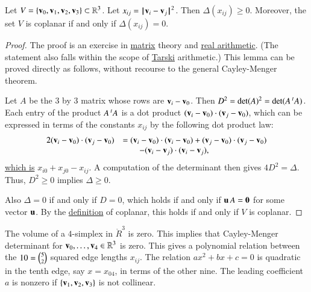 \begin{lemma}[]\label{lemma:delta-pos}
  Let $V=\{{\mathbf v}_0,{\mathbf v}_1,{\mathbf v}_2,{\mathbf v}_3\}\subset\mathbb{R}^3$.  Let $x_{ij} =
  \norm{\v_i}{\v_j}^2$.  Then $\Delta(x_{ij})\ge 0$.  Moreover, the
  set $V$ is coplanar if and only if $\Delta(x_{ij}) = 0$.
\end{lemma}

\begin{proof} The proof is an exercise in
  \hyperref[back:matrix]{matrix} theory and
  \hyperref[back:analysis]{real arithmetic}.  (The statement also
  falls within the scope of \hyperref[back:tarski]{Tarski}
  arithmetic.)  This lemma can be proved directly as follows, without
  recourse to the general Cayley-Menger theorem.

  Let $A$ be the $3$ by $3$ matrix whose rows are ${\mathbf v}_i - {\mathbf v}_0$.  Then
  $D^2 = \det(A)^2 = \det(A \,\hbox{}^t A)$.  Each entry of the
  product $A\,\hbox{}^tA$ is a dot product $({\mathbf v}_i-{\mathbf v}_0)\cdot
  ({\mathbf v}_j-{\mathbf v}_0)$, which can be expressed in terms of the constants
  $x_{ij}$ by the following dot product law:
\begin{equation}\label{eqn:dot-law}
\begin{array}{lll}
  2 ({\mathbf v}_i-{\mathbf v}_0)\cdot ({\mathbf v}_j-{\mathbf v}_0) 
&= ({\mathbf v}_i-{\mathbf v}_0)\cdot({\mathbf v}_i-{\mathbf v}_0) + ({\mathbf v}_j-{\mathbf v}_0)\cdot ({\mathbf v}_j-{\mathbf v}_0) \\
  &\qquad - ({\mathbf v}_i-{\mathbf v}_j)\cdot ({\mathbf v}_i-{\mathbf v}_j),
\end{array}
\end{equation}
\hyperref[def:norm]{which is} $x_{i0} + x_{j0} - x_{ij}$.
A computation of the determinant then gives $4D^2=\Delta$.
Thus, $D^2\ge0$ implies $\Delta\ge 0$.

Also $\Delta=0$ if and only if $D=0$, which holds if and only if ${\mathbf u}\,
A = {\mathbf 0}$ for some vector ${\mathbf u}$.  By the
\hyperref[def:plane]{definition} of coplanar, this holds if and only
if $V$ is coplanar.
\end{proof}

\begin{remark}[]
The volume of a $4$-simplex in $\ring{R}^3$ is zero.
This implies that Cayley-Menger determinant for ${\mathbf v}_0,\ldots,{\mathbf v}_4\in\mathbb{R}^3$ is zero.
This gives a polynomial relation between the $10 = \tbinom{5}{2}$ squared edge lengths $x_{ij}$.  
The relation $a x^2 + b x + c=0$ is quadratic in the tenth edge, 
say $x=x_{04}$, in terms of the other nine. The leading coefficient $a$ is nonzero if $\{{\mathbf v}_1,{\mathbf v}_2,{\mathbf v}_3\}$
is not collinear.
\end{remark}

